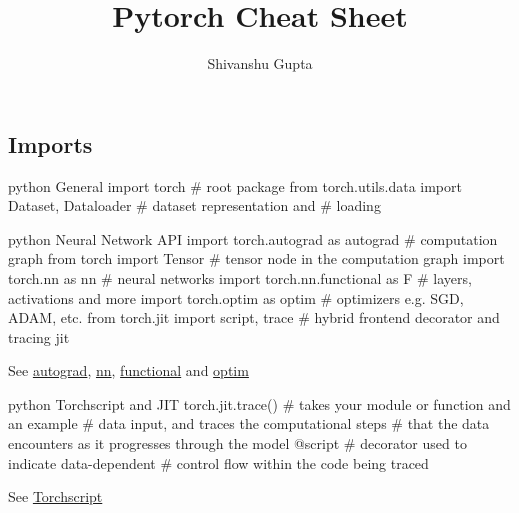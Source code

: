 \documentclass[10pt,a4paper]{article}
\title{Pytorch Cheat Sheet}
\author{Shivanshu Gupta}
\date{}
\begin{document}
\begin{multicols}{2}
\maketitle
\vspace{-12ex}

\hypertarget{imports}{%
\section{Imports}\label{imports}}

\begin{codebox}{python}{\hypertarget{general}{%
General\label{general}}}
import torch                                        # root package
from torch.utils.data import Dataset, Dataloader    # dataset representation and 
                                                    # loading
\end{codebox}

\begin{codebox}{python}{\hypertarget{neural-network-api}{%
Neural Network API\label{neural-network-api}}}
import torch.autograd as autograd     # computation graph
from torch import Tensor              # tensor node in the computation graph
import torch.nn as nn                 # neural networks
import torch.nn.functional as F       # layers, activations and more
import torch.optim as optim           # optimizers e.g. SGD, ADAM, etc.
from torch.jit import script, trace   # hybrid frontend decorator and tracing jit
\end{codebox}

See \href{https://pytorch.org/docs/stable/autograd.html}{autograd},
\href{https://pytorch.org/docs/stable/nn.html}{nn},
\href{https://pytorch.org/docs/stable/nn.html\#torch-nn-functional}{functional}
and \href{https://pytorch.org/docs/stable/optim.html}{optim}

\begin{codebox}{python}{\hypertarget{torchscript-and-jit}{%
Torchscript and JIT\label{torchscript-and-jit}}}
torch.jit.trace()   # takes your module or function and an example
                    # data input, and traces the computational steps
                    # that the data encounters as it progresses through the model
@script             # decorator used to indicate data-dependent
                    # control flow within the code being traced
\end{codebox}

See \href{https://pytorch.org/docs/stable/jit.html}{Torchscript}


\end{multicols}
\end{document}
